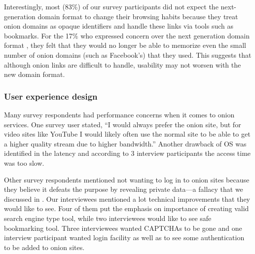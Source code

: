 Interestingly, most (83\%) of our survey participants did not expect the
next-generation domain format to change their browsing habits because they treat onion domains as
opaque identifiers and handle these links via tools such as bookmarks.  For the 17\% who expressed concern over the next generation domain format , they felt that they would no longer be able to memorize even the small
number of onion domains (such as Facebook's) that they used.
 This suggests that although onion links are difficult to handle, usability may not worsen with the new domain format.


\subsubsection{User experience design}


Many survey respondents had performance concerns when it comes to onion services.   One survey user stated, ``I would
always prefer the onion site, but for video sites like YouTube I would likely
often use the normal site to be able to get a higher quality stream due to
higher bandwidth.'' Another drawback of OS was identified in the latency and according to 3 interview participants the access time was too slow. 

Other survey respondents mentioned not wanting to log in to onion sites
because they believe it defeats the purpose by revealing private data---a fallacy that we discussed in
.  Our interviewees mentioned a lot technical improvements that they would like to see. Four of them put the emphasis on importance of creating valid search engine type tool, while two interviewees would like to see safe bookmarking tool.  Three interviewees wanted CAPTCHAs to be gone and one interview participant wanted login facility as well as to see some authentication to be added to onion sites. 

